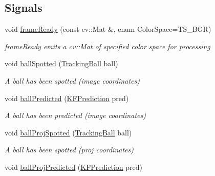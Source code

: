 \subsection*{Signals}
\begin{DoxyCompactItemize}
\item 
void \hyperlink{classTrackingStream_a65642f47a391090432e3ea401520cf6d}{frame\+Ready} (const cv\+::\+Mat \&, enum Color\+Space=T\+S\+\_\+\+B\+GR)\hypertarget{classTrackingStream_a65642f47a391090432e3ea401520cf6d}{}\label{classTrackingStream_a65642f47a391090432e3ea401520cf6d}

\begin{DoxyCompactList}\small\item\em frame\+Ready emits a cv\+::\+Mat of specified color space for processing \end{DoxyCompactList}\item 
void \hyperlink{classTrackingStream_a4c2e42cf2387b718661be00e52c71f2a}{ball\+Spotted} (\hyperlink{classTrackingBall}{Tracking\+Ball} ball)\hypertarget{classTrackingStream_a4c2e42cf2387b718661be00e52c71f2a}{}\label{classTrackingStream_a4c2e42cf2387b718661be00e52c71f2a}

\begin{DoxyCompactList}\small\item\em A ball has been spotted (image coordinates) \end{DoxyCompactList}\item 
void \hyperlink{classTrackingStream_a5cab9ddbec00add97b763b0f111dc12c}{ball\+Predicted} (\hyperlink{classKFPrediction}{K\+F\+Prediction} pred)\hypertarget{classTrackingStream_a5cab9ddbec00add97b763b0f111dc12c}{}\label{classTrackingStream_a5cab9ddbec00add97b763b0f111dc12c}

\begin{DoxyCompactList}\small\item\em A ball has been predicted (image coordinates) \end{DoxyCompactList}\item 
void \hyperlink{classTrackingStream_a87c0ea6d617a86b32de3df996d6f33c2}{ball\+Proj\+Spotted} (\hyperlink{classTrackingBall}{Tracking\+Ball} ball)\hypertarget{classTrackingStream_a87c0ea6d617a86b32de3df996d6f33c2}{}\label{classTrackingStream_a87c0ea6d617a86b32de3df996d6f33c2}

\begin{DoxyCompactList}\small\item\em A ball has been spotted (proj coordinates) \end{DoxyCompactList}\item 
void \hyperlink{classTrackingStream_aff6ad1d1f81b64ebcbf6235cd87fdecd}{ball\+Proj\+Predicted} (\hyperlink{classKFPrediction}{K\+F\+Prediction} pred)\hypertarget{classTrackingStream_aff6ad1d1f81b64ebcbf6235cd87fdecd}{}\label{classTrackingStream_aff6ad1d1f81b64ebcbf6235cd87fdecd}


\end{DoxyCompactItemize}
